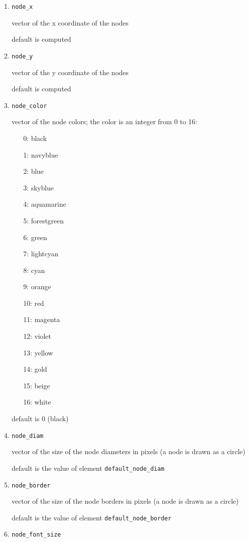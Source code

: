 \documentclass[11pt]{report}
\newcommand{\T}[1]{{\tt #1}}
\begin{document}
\begin{enumerate}
  \item \T{node\_x}

vector of the x coordinate of the nodes

default is computed

  \item \T{node\_y}

vector of the y coordinate of the nodes

default is computed

  \item \T{node\_color}

vector of the node colors; 
the color is an integer from 0 to 16:
\begin{itemize}
  \item[0:] black
  \item[1:] navyblue
  \item[2:] blue
  \item[3:] skyblue
  \item[4:] aquamarine
  \item[5:] forestgreen
  \item[6:] green
  \item[7:] lightcyan
  \item[8:] cyan
  \item[9:] orange
  \item[10:] red
  \item[11:] magenta
  \item[12:] violet
  \item[13:] yellow
  \item[14:] gold
  \item[15:] beige
  \item[16:] white
\end{itemize}


default is 0 (black)

  \item \T{node\_diam}

vector of the size of the node diameters in pixels (a node is
drawn as a circle) 

default is the value of element \T{default\_node\_diam}

  \item \T{node\_border}

vector of the size of the node borders in pixels (a node is drawn
as a circle) 

default is the value of element \T{default\_node\_border}

  \item \T{node\_font\_size}


\end{enumerate}
\end{document}
